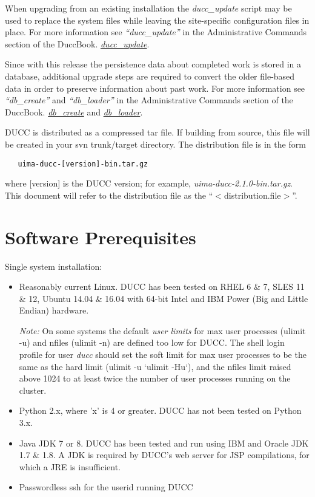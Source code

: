 When upgrading from an existing installation the {\em ducc\_update} script may be used
to replace the system files while leaving the site-specific configuration files in place. 
For more information see
\ifdefined\DUCCSTANDALONE
{\em ``ducc\_update''} in the Administrative Commands section of the DuccBook. 
\else
\hyperref[subsec:admin.ducc-update] {\em ducc\_update}. 
\fi

Since with this release the persistence data about completed work is stored in a database, 
additional upgrade steps are required to convert the older file-based data in order to preserve information 
about past work. 
For more information see
\ifdefined\DUCCSTANDALONE
{\em ``db\_create''} and {\em ``db\_loader''} in the Administrative Commands section of the DuccBook. 
\else
\hyperref[subsec:admin.db-create] {\em db\_create} and \hyperref[subsec:admin.db-loader] {\em db\_loader}. 
\fi


DUCC is distributed as a compressed tar file.  If building from source, this file will be created in your svn
trunk/target directory. The distribution file is in the form
\begin{verbatim}
   uima-ducc-[version]-bin.tar.gz
\end{verbatim}
where [version] is the DUCC version; for example, {\em uima-ducc-2.1.0-bin.tar.gz}.  This document will refer to the distribution
file as the ``$<$distribution.file$>$''.

\section{Software Prerequisites}
\label{sec:install.prerequisites}

Single system installation:

\begin{itemize}
  \item Reasonably current Linux.  DUCC has been tested on RHEL 6 \& 7, SLES 11 \& 12, Ubuntu 14.04 \& 16.04
    with 64-bit Intel and IBM Power (Big and Little Endian) hardware.
    
    {\em Note:} On some systems the default {\em user limits}
    for max user processes (ulimit -u) and nfiles (ulimit -n) are defined too
    low for DUCC. The shell login profile for user {\em ducc} should set the
    soft limit for max user processes to be the same as the hard limit
    (ulimit -u `ulimit -Hu`), and
    the nfiles limit raised above 1024 to at least twice the number of user
    processes running on the cluster.

  \item Python 2.x, where 'x' is 4 or greater.  DUCC has not been tested on Python 3.x.
  \item Java JDK 7 or 8. DUCC has been tested and run using IBM and Oracle JDK 1.7 \& 1.8.  A JDK is required by DUCC's web server for JSP compilations, for which a JRE is insufficient.
  \item Passwordless ssh for the userid running DUCC
\end{itemize}
  
